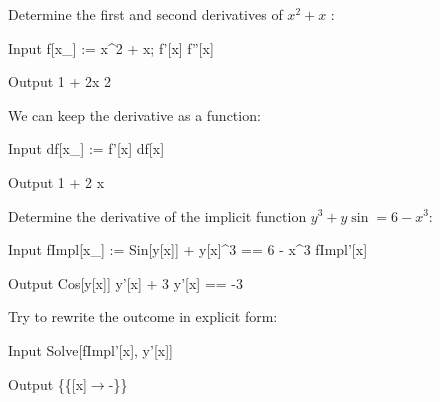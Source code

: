 \begin{example}
Determine the first and second derivatives of $x^2+x$ :
	
\begin{mdframed}[default,backgroundcolor=gray!40,roundcorner=8pt]

	\begin{mmaCell}[functionlocal={x_,x}]{Input}
		f[x_] := x^2 + x;
		f'[x]
		f''[x]
	\end{mmaCell}
	\begin{mmaCell}{Output}
		1 + 2x
		2
	\end{mmaCell}
\end{mdframed}

	We can keep the derivative as a function:

\begin{mdframed}[default,backgroundcolor=gray!40,roundcorner=8pt]
	\begin{mmaCell}[functionlocal={x_,x}]{Input}
		df[x_] := f'[x]
		df[x]
	\end{mmaCell}
	\begin{mmaCell}{Output}
		1 + 2 x
	\end{mmaCell}
\end{mdframed}

	Determine the derivative of the implicit function $y^3+y \sin =6-x^3$: 

\begin{mdframed}[default,backgroundcolor=gray!40,roundcorner=8pt]
	\begin{mmaCell}[functionlocal={x}]{Input}
		fImpl[x_] := Sin[y[x]] + y[x]^3 == 6 - x^3
		fImpl'[x]
	\end{mmaCell}
	\begin{mmaCell}{Output}
		Cos[y[x]] y'[x] + 3  y'[x] == -3 
	\end{mmaCell}
\end{mdframed}

	Try to rewrite the outcome in explicit form: 

\begin{mdframed}[default,backgroundcolor=gray!40,roundcorner=8pt]
	\begin{mmaCell}[]{Input}
		Solve[fImpl'[x], y'[x]]	
	\end{mmaCell}
	\begin{mmaCell}{Output}
		\{\{[x]\(\to\)-\}\}
	\end{mmaCell}
\end{mdframed}
\end{example}


